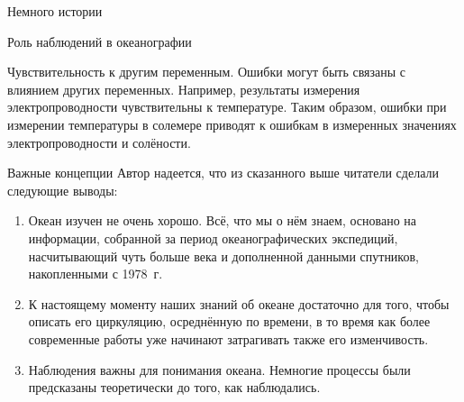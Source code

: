 \begin{chapter}{Немного истории}
\begin{section}{Роль наблюдений в океанографии}
\begin{paragraph}{Чувствительность к другим переменным.}
Ошибки могут быть связаны с влиянием других переменных. 
Например, результаты измерения электропроводности чувствительны к температуре. 
Таким образом, ошибки при измерении температуры в солемере приводят к 
ошибкам в измеренных значениях электропроводности и солёности.
%
\end{paragraph}
\end{section}

\begin{section}{Важные концепции}
Автор надеется, что из сказанного выше читатели сделали следующие выводы:
%
%
\begin{enumerate}
\item
Океан изучен не очень хорошо. Всё, что мы о нём знаем, основано на
информации, собранной за период океанографических экспедиций,
насчитывающий чуть больше века и дополненной данными
спутников, накопленными с 1978~г.
%

\item
К настоящему моменту наших знаний об океане достаточно для того, чтобы
описать его циркуляцию, осреднённую по времени, в то время как более 
современные работы уже начинают затрагивать также его изменчивость.
%

\item
Наблюдения важны для понимания океана. Немногие процессы были
предсказаны теоретически до того, как наблюдались.
%


\end{enumerate}
\end{section}
\end{chapter}
